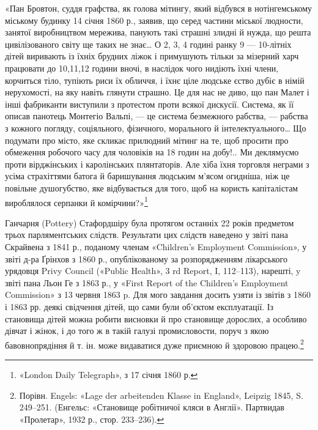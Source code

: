 «Пан Бровтон, суддя графства, як голова мітингу, який
відбувся в нотінгемському міському будинку 14 січня 1860 р.,
заявив, що серед частини міської людности, занятої виробництвом
мережива, панують такі страшні злидні й нужда, що решта цивілізованого
світу ще таких не знає\dots{} О 2, 3, 4 годині ранку 9 —
10-літніх дітей виривають із їхніх брудних ліжок і примушують
тільки за мізерний харч працювати до 10,11,12 години вночі,
в наслідок чого нидіють їхні члени, корчиться тіло, тупіють риси
їх обличчя, і їхнє ціле людське єство дубіє в німій нерухомості, на
яку навіть глянути страшно. Це для нас не диво, що пан Малет
і інші фабриканти виступили з протестом проти всякої дискусії.
Система, як її описав панотець Монтегіо Вальпі, — це система безмежного
рабства, — рабства з кожного погляду, соціяльного, фізичного,
морального й інтелектуального\dots{} Що подумати про місто,
яке скликає прилюдний мітинг на те, щоб просити про обмеження
робочого часу для чоловіків на 18 годин на добу!.. Ми деклямуємо
проти вірджінських і каролінських плянтаторів. Але хіба їхня
торговля неграми з усіма страхіттями батога й баришування людським
м’ясом огидніша, ніж це повільне душогубство, яке відбувається
для того, щоб на користь капіталістам вироблялося
серпанки й комірчини?»\footnote{
«London Daily Telegraph», з 17 січня 1860 р.
}

Ганчарня (Pottery) Стафордшіру була протягом останніх
22 років предметом трьох парляментських слідств. Результати
цих слідств наведено у звіті пана Скрайвена з 1841 р., поданому
членам «Children’s Employment Commission», у звіті д-ра
Ґрінхов з 1860 р., опублікованому за розпорядженням лікарського
урядовця Privy Council («Public Health», 3 rd Report,
I, 112--113), нарешті, y звіті пана Льон Ге з 1863 р., у «First
Report of the Children’s Employment Commission» з 13 червня
1863 p. Для мого завдання досить узяти із звітів з 1860 і 1863 рр.
деякі свідчення дітей, що сами були об’єктом експлуатації. Із
становища дітей можна робити висновки й про становище дорослих,
а особливо дівчат і жінок, і до того ж в такій галузі промисловости,
поруч з якою бавовнопрядіння й т. ін. може видаватися
дуже приємною й здоровою працею.\footnote{
Порівн. Engels: «Lage der arbeitenden Klasse in England»,
Leipzig 1845, S. 249--251. (Енгельс: «Становище робітничої кляси в
Англії». Партвидав «Пролетар», 1932 р., стор. 233--236).
}

